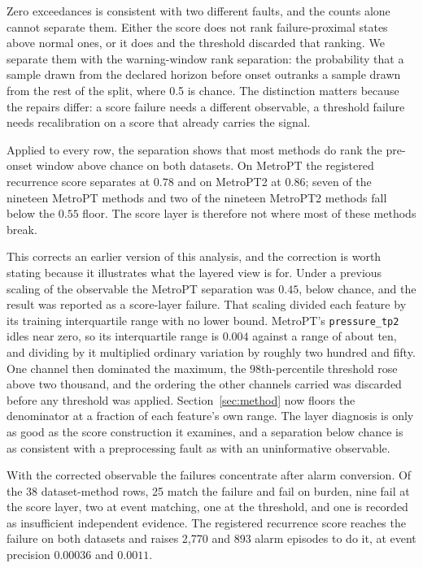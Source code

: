 Zero exceedances is consistent with two different faults, and the counts alone cannot separate them. Either the score does not rank failure-proximal states above normal ones, or it does and the threshold discarded that ranking. We separate them with the warning-window rank separation: the probability that a sample drawn from the declared horizon before onset outranks a sample drawn from the rest of the split, where 0.5 is chance. The distinction matters because the repairs differ: a score failure needs a different observable, a threshold failure needs recalibration on a score that already carries the signal.

Applied to every row, the separation shows that most methods do rank the pre-onset window above chance on both datasets. On MetroPT the registered recurrence score separates at \(0.78\) and on MetroPT2 at \(0.86\); seven of the nineteen MetroPT methods and two of the nineteen MetroPT2 methods fall below the \(0.55\) floor. The score layer is therefore not where most of these methods break.

This corrects an earlier version of this analysis, and the correction is worth stating because it illustrates what the layered view is for. Under a previous scaling of the observable the MetroPT separation was \(0.45\), below chance, and the result was reported as a score-layer failure. That scaling divided each feature by its training interquartile range with no lower bound. MetroPT's \texttt{pressure\_tp2} idles near zero, so its interquartile range is \(0.004\) against a range of about ten, and dividing by it multiplied ordinary variation by roughly two hundred and fifty. One channel then dominated the maximum, the \(98\)th-percentile threshold rose above two thousand, and the ordering the other channels carried was discarded before any threshold was applied. Section~\ref{sec:method} now floors the denominator at a fraction of each feature's own range. The layer diagnosis is only as good as the score construction it examines, and a separation below chance is as consistent with a preprocessing fault as with an uninformative observable.

With the corrected observable the failures concentrate after alarm conversion. Of the 38 dataset-method rows, 25 match the failure and fail on burden, nine fail at the score layer, two at event matching, one at the threshold, and one is recorded as insufficient independent evidence. The registered recurrence score reaches the failure on both datasets and raises 2{,}770 and 893 alarm episodes to do it, at event precision \(0.00036\) and \(0.0011\).

